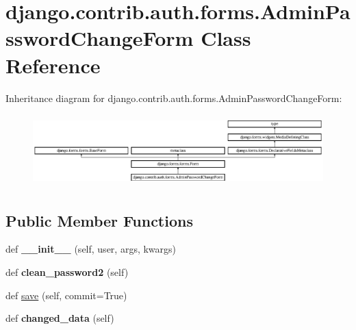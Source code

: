 \hypertarget{classdjango_1_1contrib_1_1auth_1_1forms_1_1_admin_password_change_form}{}\section{django.\+contrib.\+auth.\+forms.\+Admin\+Password\+Change\+Form Class Reference}
\label{classdjango_1_1contrib_1_1auth_1_1forms_1_1_admin_password_change_form}
Inheritance diagram for django.\+contrib.\+auth.\+forms.\+Admin\+Password\+Change\+Form\+:\begin{figure}[H]
\begin{center}
\leavevmode
\includegraphics[height=2.819738cm]{classdjango_1_1contrib_1_1auth_1_1forms_1_1_admin_password_change_form}
\end{center}
\end{figure}
\subsection*{Public Member Functions}
\begin{DoxyCompactItemize}
\item 
\mbox{\label{classdjango_1_1contrib_1_1auth_1_1forms_1_1_admin_password_change_form_a7bf29d45466c860cc034d583e4d8587f}} 
def {\bfseries \+\_\+\+\_\+init\+\_\+\+\_\+} (self, user, args, kwargs)
\item 
\mbox{\label{classdjango_1_1contrib_1_1auth_1_1forms_1_1_admin_password_change_form_a698ca3e606942083e4c2c995ec6e1f41}} 
def {\bfseries clean\+\_\+password2} (self)
\item 
def \mbox{\hyperlink{classdjango_1_1contrib_1_1auth_1_1forms_1_1_admin_password_change_form_a518d15d83bb09f0cd3e5ded33fd22852}{save}} (self, commit=True)
\item 
\mbox{\label{classdjango_1_1contrib_1_1auth_1_1forms_1_1_admin_password_change_form_afddb2fa983a008df43b659eee7447a26}} 
def {\bfseries changed\+\_\+data} (self)
\end{DoxyCompactItemize}
